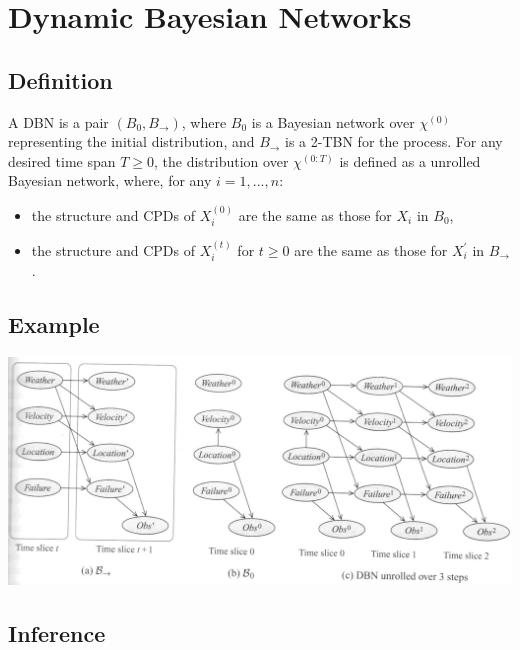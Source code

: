 \section{Dynamic Bayesian Networks}
\subsection{Definition}
\begin{frame}
\begin{definition}
        A DBN is a pair $(B_0, B_{\rightarrow})$, where $B_0$ is a Bayesian network over $\chi^{(0)}$ representing the initial distribution, and $B_{\rightarrow}$ is a 2-TBN for the process. For any desired time span $T \geq 0$, the distribution over $\chi^{(0:T)}$ is defined as a unrolled Bayesian network, where, for any $i=1,...,n$:
        \begin{itemize}
        \item the structure and CPDs of $X_i^{(0)}$ are the same as those for $X_i$ in $B_0$,
        \item the structure and CPDs of $X_i^{(t)}$ for $ t \geq 0 $ are the same as those for $X_i^{'}$ in $B_\rightarrow$.
        \end{itemize}
\end{definition}
\end{frame}

\subsection{Example}
\begin{frame}
\includegraphics[width=1\textwidth]{figures/dbn}
\end{frame}

\subsection{Inference}

